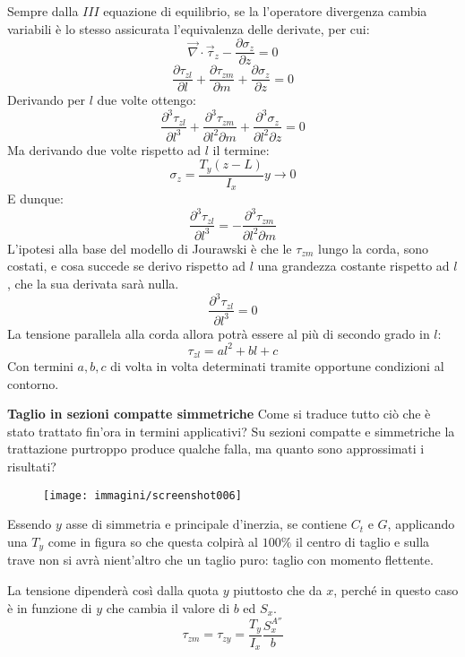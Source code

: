 \documentclass{article}
\begin{document}
\begin{adjustwidth}{2in}{}
		Sempre dalla $III$ equazione di equilibrio, se la l'operatore divergenza cambia variabili è lo stesso assicurata l'equivalenza delle derivate, per cui: 
		\[ \vec{\nabla}\cdot\vec{\tau}_z  -\dfrac{\partial \sigma_z}{\partial z} = 0\]
		\[ \dfrac{\partial \tau_{zl}}{\partial l} + \dfrac{\partial\tau_{zm}}{\partial m} + \dfrac{\partial\sigma_z}{\partial z} = 0\]
		Derivando per $l$ due volte ottengo: 
		\[ \dfrac{\partial^3 \tau_{zl}}{\partial l^3} + \dfrac{\partial^3\tau_{zm}}{\partial l^2\partial m} + \dfrac{\partial^3\sigma_z}{\partial l^2\partial z} = 0\]
		Ma derivando due volte rispetto ad $l$ il termine:
		\[\sigma_z =  \dfrac{T_y(z-L)}{I_x}y \rightarrow 0\]
		E dunque:
		\[ \dfrac{\partial^3 \tau_{zl}}{\partial l^3} = - \dfrac{\partial^3\tau_{zm}}{\partial l^2\partial m}\]
		L'ipotesi alla base del modello di Jourawski è che le $\tau_{zm}$ lungo la corda, sono costati, e cosa succede se derivo rispetto ad $l$ una grandezza costante rispetto ad $l$, che la sua derivata sarà nulla. 		
		\[ \dfrac{\partial^3 \tau_{zl}}{\partial l^3} = 0\]
		La tensione parallela alla corda allora potrà essere al più di secondo grado in $l$:
		\[ \tau_{zl} = al^2 + bl + c\]
		Con termini $a,b,c$ di volta in volta determinati tramite opportune condizioni al contorno. \newline 
		
		\textbf{{\Large Taglio in sezioni compatte simmetriche}} \newline 
		Come si traduce tutto ciò che è stato trattato fin'ora in termini applicativi? Su sezioni compatte e simmetriche la trattazione purtroppo produce qualche falla, ma quanto sono approssimati i risultati?
		
\begin{figure}[H]
	\centering
	\label{fig:screenshot006}
	\texttt{[image: immagini/screenshot006]}
\end{figure}

		Essendo $y$ asse di simmetria e principale d'inerzia, se contiene $C_t$ e $G$, applicando una $T_y$ come in figura so che questa colpirà al $100\%$ il centro di taglio e sulla trave non si avrà nient'altro che un taglio puro: taglio con momento flettente. \newline 
		
		La tensione dipenderà così dalla quota $y$ piuttosto che da $x$, perché in questo caso è in funzione di $y$ che cambia il valore di $b$ ed $S_x$. 
		\[ \tau_{zm} = \tau_{zy} = \dfrac{T_y}{I_x}\dfrac{S_x^{A''}}{b}\]
		

\end{adjustwidth}
\end{document}
